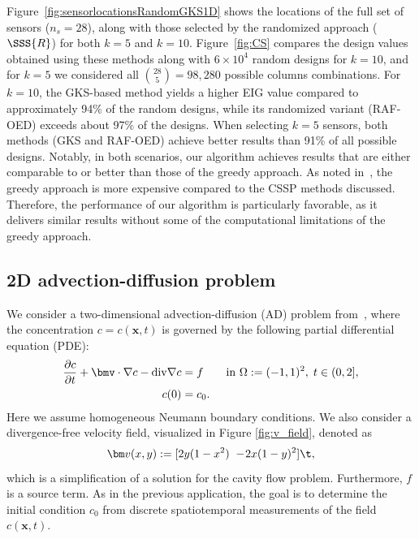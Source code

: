 \documentclass{aims} %
\theoremstyle{definition}
\begin{document}
Figure~\ref{fig:sensorlocationsRandomGKS1D} shows the locations of the full set of sensors ($n_s=28$), along with those selected by the randomized approach ($\SSS{R}$) for both $k=5$ and $k=10$. 
Figure~\ref{fig:CS}  compares the design values obtained using these methods along with \(6 \times 10^4\) random designs  for $k=10$, and for $k=5$ we considered all ${28 \choose 5 } = 98,280$ possible columns combinations. 
%
For $k=10$, the GKS-based method yields a higher EIG value compared to approximately 94\% of the random designs, while its randomized variant (RAF-OED) exceeds about 97\% of the designs.
%
When selecting \(k=5\) sensors, both methods (GKS and RAF-OED) achieve better results than 91\% of all possible designs. 
%
Notably, in both scenarios, our algorithm achieves results that are either comparable to or better than those of the greedy approach. As noted in~\cite{eswar2024bayesian}, the greedy approach is more expensive compared to the CSSP methods discussed. 
% 
Therefore, the performance of our algorithm is particularly favorable, as it delivers similar results without some of the computational limitations of the greedy approach.





\subsection{2D advection-diffusion problem}
We consider a two-dimensional advection-diffusion (AD) problem from~\cite{VillaPetraGhattas21}, where the concentration $c= c(\bm x,t) $ is governed by the following partial differential equation (PDE):
\begin{align}
\begin{aligned}
    \frac{\partial c}{\partial t} + \bmv\cdot \nabla c- \mathrm{div} \nabla c &= f \qquad \mbox{in } \Omega:= (-1,1)^2,\; t \in (0,2], \\ %
    c(0)&= c_0.
\end{aligned}
    \label{eq:AD}
\end{align}
%
Here we assume homogeneous Neumann boundary conditions. We also consider a divergence-free velocity field, visualized in Figure \ref{fig:v_field}, denoted as 
$$\bm v(x,y):=[2y(1-x^2)\,\, -\!2x(1-y)^2]\t,$$ 
which is  a simplification of a solution for the cavity flow problem. Furthermore, $f$ is a source term. As in the previous application, the goal is to determine the initial condition $c_0$ from discrete spatiotemporal measurements of the field $c(\bm{x},t)$. 
\end{document}
